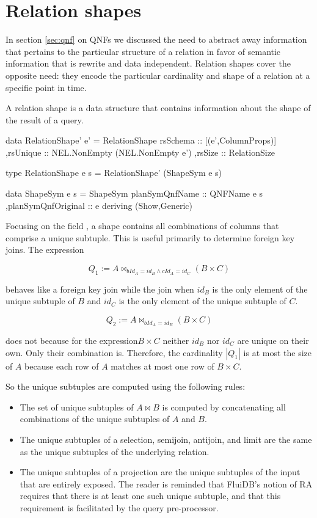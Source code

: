 \section{Relation shapes}
\label{sec:relation_shapes}

In section \ref{sec:qnf} on QNFs we discussed the need to abstract away
information that pertains to the particular structure of a relation in
favor of semantic information that is rewrite and data
independent. Relation shapes cover the opposite need: they encode the
particular cardinality and shape of a relation at a specific point in
time.

A relation shape is a data structure that contains information about
the shape of the result of a query.

\begin{haskellcode}
  data RelationShape' e' =
    RelationShape
    { rsSchema :: [(e',ColumnProps)]
      ,rsUnique :: NEL.NonEmpty (NEL.NonEmpty e')
      ,rsSize :: RelationSize
    }

  type RelationShape e s = RelationShape' (ShapeSym e s)

  data ShapeSym e s =
    ShapeSym { planSymQnfName :: QNFName e s
      ,planSymQnfOriginal :: e
    }
    deriving (Show,Generic)
\end{haskellcode}

Focusing on the field , a shape contains 
all combinations of columns that comprise a unique
subtuple.  This is useful primarily to determine foreign key
joins. The expression

\[Q_1 := A \Join_{bId_A = id_B \land cId_A = id_C} (B \times C)\]

behaves like a foreign key join while the join when \(id_B\) is the
only element of the unique subtuple of \(B\) and \(id_C\) is the only
element of the unique subtuple of \(C\).

\[Q_2 := A \Join_{bId_A = id_B} (B \times C)\]

does not because for the expression\(B \times C\) neither \(id_B\) nor
\(id_C\) are unique on their own.  Only their combination
is. Therefore, the cardinality \(|Q_1|\) is at most the size of \(A\)
because each row of \(A\) matches at most one row of \(B \times C\).

So the unique subtuples are computed using the following rules:

\begin{itemize}
\item The set of unique subtuples of \(A \Join B\) is
  computed by concatenating all combinations of the unique subtuples
  of \(A\) and \(B\).
\item The unique subtuples of a selection, semijoin, antijoin, and limit are the same as the unique
  subtuples of the underlying relation.
\item The unique subtuples of a projection are the unique subtuples of
  the input that are entirely exposed.  The reader is reminded that
  FluiDB's notion of RA requires that there is at least one such
  unique subtuple, and that this requirement is facilitated by the
  query pre-processor.
\end{itemize}

